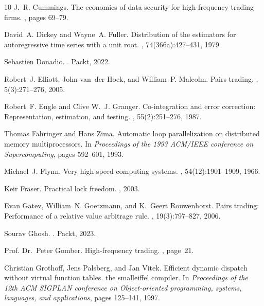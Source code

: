 \documentclass{article}
\theoremstyle{break}
\begin{document}
\begin{thebibliography}{10}
J.~R. Cummings.
\newblock The economics of data security for high-frequency trading firms.
, pages 69--79.

David~A. Dickey and Wayne~A. Fuller.
\newblock Distribution of the estimators for autoregressive time series with a unit root.
, 74(366a):427--431, 1979.

Sebastien Donadio.
.
\newblock Packt, 2022.

Robert~J. Elliott, John van~der Hoek, and William~P. Malcolm.
\newblock Pairs trading.
, 5(3):271--276, 2005.

Robert~F. Engle and Clive W.~J. Granger.
\newblock Co-integration and error correction: Representation, estimation, and testing.
, 55(2):251--276, 1987.

Thomas Fahringer and Hans Zima.
\newblock Automatic loop parallelization on distributed memory multiprocessors.
\newblock In {\em Proceedings of the 1993 ACM/IEEE conference on Supercomputing}, pages 592--601, 1993.

Michael~J. Flynn.
\newblock Very high-speed computing systems.
, 54(12):1901--1909, 1966.

Keir Fraser.
\newblock Practical lock freedom.
, 2003.

Evan Gatev, William~N. Goetzmann, and K.~Geert Rouwenhorst.
\newblock Pairs trading: Performance of a relative value arbitrage rule.
, 19(3):797--827, 2006.

Sourav Ghosh.
.
\newblock Packt, 2023.

Prof. Dr.~Peter Gomber.
\newblock High-frequency trading.
, page~21.

Christian Grothoff, Jens Palsberg, and Jan Vitek.
\newblock Efficient dynamic dispatch without virtual function tables. the smalleiffel compiler.
\newblock In {\em Proceedings of the 12th ACM SIGPLAN conference on Object-oriented programming, systems, languages, and applications}, pages 125--141, 1997.


\end{thebibliography}
\end{document}
